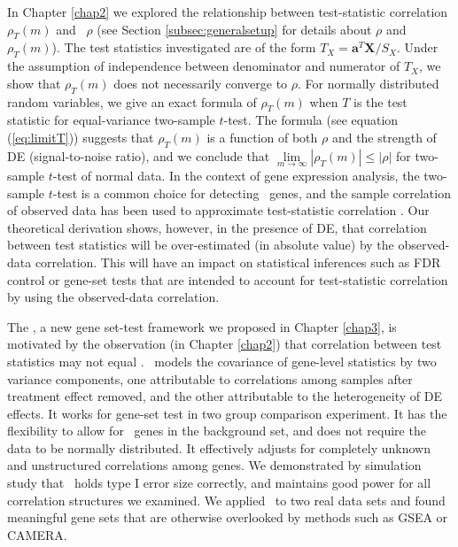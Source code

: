 In Chapter \ref{chap2} we explored the relationship between test-statistic correlation $\rho_T(m)$
and \popucor~$\rho$ (see Section \ref{subsec:generalsetup} for details about $\rho$ and 
$\rho_T(m)$). The test statistics investigated are of the form $T_X = \bm a^T\bm 
X/S_X$. Under the assumption of independence between denominator and numerator of $T_X$, we show 
that $\rho_T(m)$ does not necessarily converge to $\rho$. For normally distributed 
random variables, we give an exact formula of $\rho_T(m)$ when $T$ is the test statistic for 
equal-variance two-sample $t$-test. The formula (see equation (\ref{eq:limitT})) suggests that 
$\rho_T(m)$ is a function of both $\rho$ and the strength of DE (signal-to-noise ratio), and we 
conclude that $\lim\limits_{m\rightarrow\infty}|\rho_T(m)|\leq 
|\rho|$ for two-sample $t$-test of normal data. In the context of gene expression analysis, the 
two-sample $t$-test is a common choice for 
detecting \DED~genes, and the sample correlation of observed data has been used to approximate 
test-statistic correlation \cite{barry2008statistical,efron2007correlation,wu2012camera}. Our 
theoretical derivation shows, however, in the presence of DE, that correlation between test 
statistics will be over-estimated (in absolute value) by the observed-data correlation. This will 
have an impact on statistical inferences such as 
FDR control or gene-set tests that are intended to account for test-statistic
correlation by using the observed-data correlation.

The \OurMethod, a new gene set-test framework we proposed in Chapter \ref{chap3}, is motivated by 
the observation (in Chapter \ref{chap2}) that correlation between test statistics may not equal 
\popucor. \OurMethod~models the covariance 
of gene-level statistics by two variance components, one 
attributable to correlations among samples after treatment effect 
removed, and the other attributable to the heterogeneity of DE effects. It works for gene-set test 
in two group comparison experiment. It has the flexibility to allow for \DED~genes in the 
background set, and does not require the data to be normally distributed. It effectively adjusts 
for completely unknown and unstructured correlations among genes. 
 We demonstrated by simulation study that \OurMethod~holds type I error size 
correctly, and maintains good power for all correlation structures we examined. We applied
\OurMethod~to two real data sets and found meaningful gene sets that are otherwise overlooked by 
methods such as GSEA or CAMERA.



